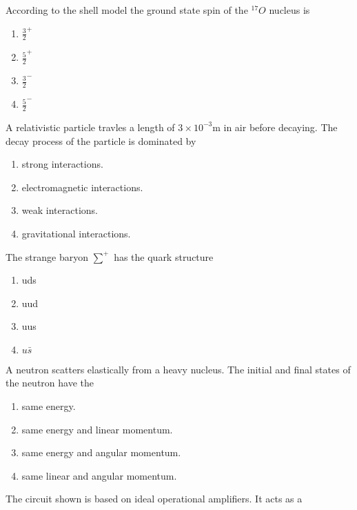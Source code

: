	\item According to the shell model the ground state spin of the $^{17}O$ nucleus is
		\begin{enumerate}
			\item $\frac{3}{2}^+$
			\item $\frac{5}{2}^+$
			\item $\frac{3}{2}^-$
			\item $\frac{5}{2}^-$
		\end{enumerate}
	\item A relativistic particle travles a length of $3\times10^{-3}$m in air before decaying. The decay process of the particle is dominated by
		\begin{enumerate}
			\item strong interactions.
			\item electromagnetic interactions.
			\item weak interactions.
			\item gravitational interactions.
		\end{enumerate}
	\item The strange baryon $\sum^+$ has the quark structure
		\begin{enumerate}
			\item uds
			\item uud
			\item uus
			\item $u\bar{s}$
		\end{enumerate}
	\item A neutron scatters elastically from a heavy nucleus. The initial and final states of the neutron have the
		\begin{enumerate}
			\item same energy.
			\item same energy and linear momentum.
			\item same energy and angular momentum.
			\item same linear and angular momentum.
		\end{enumerate}
	\item The circuit shown is based on ideal operational amplifiers. It acts as a
